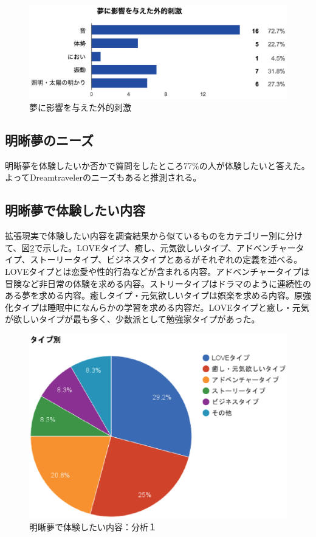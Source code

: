 \begin{figure}[htbp]
\begin{center}
\includegraphics[width=15cm]{eps/input.eps}
\caption{夢に影響を与えた外的刺激}
\label{externalShigeki}
\end{center}
\end{figure}

\subsection{明晰夢のニーズ}
明晰夢を体験したいか否かで質問をしたところ77\%の人が体験したいと答えた。よってDreamtravelerのニーズもあると推測される。

\subsection{明晰夢で体験したい内容}
拡張現実で体験したい内容を調査結果から似ているものをカテゴリー別に分けて、図\ref{desiredDreamTpye}で示した。LOVEタイプ、癒し、元気欲しいタイプ、アドベンチャータイプ、ストーリータイプ、ビジネスタイプとあるがそれぞれの定義を述べる。LOVEタイプとは恋愛や性的行為などが含まれる内容。アドベンチャータイプは冒険など非日常の体験を求める内容。ストリータイプはドラマのように連続性のある夢を求める内容。癒しタイプ・元気欲しいタイプは娯楽を求める内容。原強化タイプは睡眠中になんらかの学習を求める内容だ。LOVEタイプと癒し・元気が欲しいタイプが最も多く、少数派として勉強家タイプがあった。

\begin{figure}[htbp]
\begin{center}
\includegraphics[width=15cm]{eps/dreamType.eps}
\caption{明晰夢で体験したい内容：分析１}
\label{desiredDreamTpye}
\end{center}
\end{figure}

